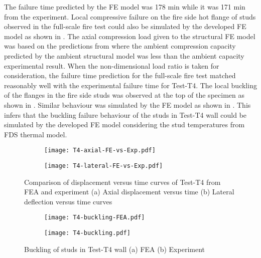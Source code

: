 The failure time predicted by the FE model was 178 min while it was 171 min from the experiment. Local compressive failure on the fire side hot flange of studs observed in the full-scale fire test could also be simulated by the developed FE model as shown in . The axial compression load given to the structural FE model was based on the predictions from  where the ambient compression capacity predicted by the ambient structural model was less than the ambient capacity experimental result. When the non-dimensional load ratio is taken for consideration, the failure time prediction for the full-scale fire test matched reasonably well with the experimental failure time for Test-T4. The local buckling of the flanges in the fire side studs was observed at the top of the specimen as shown in . Similar behaviour was simulated by the FE model as shown in . This infers that the buckling failure behaviour of the studs in Test-T4 wall could be simulated by the developed FE model considering the stud temperatures from FDS thermal model. 
\begin{figure}[!htbp]
	\centering
	\begin{subfigure}[b]{0.7\textwidth}
		\centering
		\texttt{[image: T4-axial-FE-vs-Exp.pdf]}
		\caption{}
		\label{subfig:T4-axial-FE-vs-Exp}
	\end{subfigure}
	\begin{subfigure}[b]{0.7\textwidth}
		\centering
		\texttt{[image: T4-lateral-FE-vs-Exp.pdf]}
		\caption{}
		\label{subfig:T4-lateral-FE-vs-Exp}
	\end{subfigure}
	   \caption{Comparison of displacement versus time curves of Test-T4 from FEA and experiment (a) Axial displacement versus time (b) Lateral deflection versus time curves}
	   \label{fig:T4-structural-FE-vs-Exp}
\end{figure} 
\begin{figure}[!htbp]
	\centering
	\begin{subfigure}[b]{0.85\textwidth}
		\centering
		\texttt{[image: T4-buckling-FEA.pdf]}
		\caption{}
		\label{subfig:T4-buckling-FEA}
	\end{subfigure}
	\begin{subfigure}[b]{0.55\textwidth}
		\centering
		\texttt{[image: T4-buckling.pdf]}
		\caption{}
		\label{subfig:T4-buckling-FEA-Exp}
	\end{subfigure}
	   \caption{Buckling of studs in Test-T4 wall (a) FEA (b) Experiment}
	   \label{fig:T4-buckling-FE-vs-Exp}
\end{figure} 

